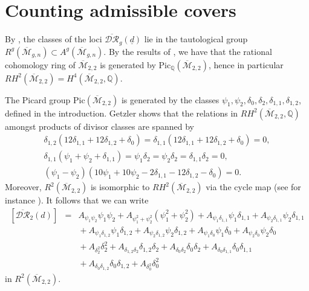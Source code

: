 \documentclass[10pt]{amsart}
\theoremstyle{definition}
\begin{document}
\section{Counting admissible covers}
\label{adm}

By \cite{MR2120989}, the classes of the loci $\overline{\mathcal{DR}}_g(\underline{d})$ lie in the tautological group $R^g({\overline{\mathcal{M}}}_{g,n})\subset A^g({\overline{\mathcal{M}}}_{g,n})$. By the results of \cite{MR1672112}, we have that the rational cohomology ring of ${\overline{\mathcal{M}}}_{2,2}$ is generated by $\textrm{Pic}_{\mathbb{Q}}({\overline{\mathcal{M}}}_{2,2})$, hence in particular $RH^2({\overline{\mathcal{M}}}_{2,2})=H^4({\overline{\mathcal{M}}}_{2,2},\mathbb{Q})$.  

The Picard group $\textrm{Pic}({\overline{\mathcal{M}}}_{2,2})$ is generated by the classes $\psi_1, \psi_2, \delta_0, \delta_2, \delta_{1,1}, \delta_{1,2}$, defined in the introduction.
Getzler shows that the relations in $RH^2({\overline{\mathcal{M}}}_{2,2},\mathbb{Q})$ amongst products of divisor classes are spanned by
\begin{eqnarray}
\label{relations}
 \delta_{1,2}\left(12\delta_{1,1}+12\delta_{1,2}+\delta_0 \right)=\delta_{1,1}\left(12\delta_{1,1}+12\delta_{1,2}+\delta_0 \right)=0,\nonumber\\
\delta_{1,1}\left(\psi_1+\psi_2+\delta_{1,1} \right)=\psi_1\delta_2=\psi_2\delta_2=\delta_{1,1}\delta_2=0,\\
\left(\psi_1-\psi_2 \right)\left(10\psi_1+10\psi_2-2\delta_{1,1}-12\delta_{1,2}-\delta_0 \right)=0.\nonumber
\end{eqnarray}
Moreover, $R^2({\overline{\mathcal{M}}}_{2,2})$ is isomorphic to $RH^2({\overline{\mathcal{M}}}_{2,2})$ via the cycle map (see for instance \cite{MR2294106}). It follows that we can write 
\begin{eqnarray}
\label{basis}
\left[\overline{\mathcal{DR}}_2(d)\right] &=& 
A_{\psi_1\psi_2} \psi_1\psi_2 + A_{\psi_1^2+\psi_2^2} \left(\psi_1^2+\psi_2^2\right) + A_{\psi_1\delta_{1,1}} \psi_1\delta_{1,1} + A_{\psi_2\delta_{1,1}} \psi_2\delta_{1,1} \nonumber\\
&&{}+ A_{\psi_1\delta_{1,2}} \psi_1\delta_{1,2} + A_{\psi_2\delta_{1,2}} \psi_2\delta_{1,2} + A_{\psi_1\delta_0} \psi_1\delta_0 + A_{\psi_2\delta_0} \psi_2\delta_0 \nonumber\\
&&{}+A_{\delta_2^2} \delta_2^2  + A_{\delta_{1,2}\delta_2} \delta_{1,2}\delta_2 + A_{\delta_0\delta_2} \delta_0\delta_2 + A_{\delta_0\delta_{1,1}} \delta_0\delta_{1,1} \\
&&{}+ A_{\delta_0\delta_{1,2}} \delta_0\delta_{1,2} + A_{\delta_0^2} \delta_0^2\nonumber
\end{eqnarray}
in $R^2({\overline{\mathcal{M}}}_{2,2})$.
\end{document}
